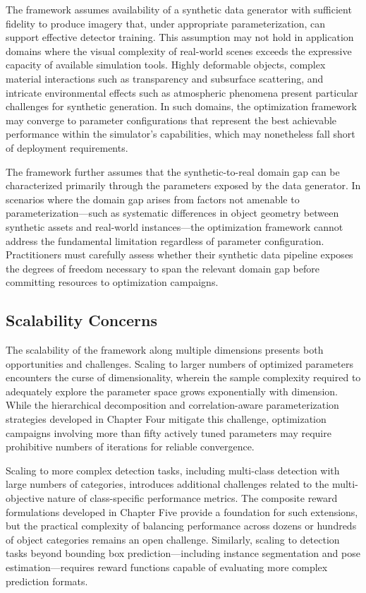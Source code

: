 The framework assumes availability of a synthetic data generator with sufficient fidelity to produce imagery that, under appropriate parameterization, can support effective detector training. This assumption may not hold in application domains where the visual complexity of real-world scenes exceeds the expressive capacity of available simulation tools. Highly deformable objects, complex material interactions such as transparency and subsurface scattering, and intricate environmental effects such as atmospheric phenomena present particular challenges for synthetic generation. In such domains, the optimization framework may converge to parameter configurations that represent the best achievable performance within the simulator's capabilities, which may nonetheless fall short of deployment requirements.

The framework further assumes that the synthetic-to-real domain gap can be characterized primarily through the parameters exposed by the data generator. In scenarios where the domain gap arises from factors not amenable to parameterization---such as systematic differences in object geometry between synthetic assets and real-world instances---the optimization framework cannot address the fundamental limitation regardless of parameter configuration. Practitioners must carefully assess whether their synthetic data pipeline exposes the degrees of freedom necessary to span the relevant domain gap before committing resources to optimization campaigns.

\subsection{Scalability Concerns}
\label{subsec:scalability}

The scalability of the framework along multiple dimensions presents both opportunities and challenges. Scaling to larger numbers of optimized parameters encounters the curse of dimensionality, wherein the sample complexity required to adequately explore the parameter space grows exponentially with dimension. While the hierarchical decomposition and correlation-aware parameterization strategies developed in Chapter Four mitigate this challenge, optimization campaigns involving more than fifty actively tuned parameters may require prohibitive numbers of iterations for reliable convergence.

Scaling to more complex detection tasks, including multi-class detection with large numbers of categories, introduces additional challenges related to the multi-objective nature of class-specific performance metrics. The composite reward formulations developed in Chapter Five provide a foundation for such extensions, but the practical complexity of balancing performance across dozens or hundreds of object categories remains an open challenge. Similarly, scaling to detection tasks beyond bounding box prediction---including instance segmentation and pose estimation---requires reward functions capable of evaluating more complex prediction formats.

